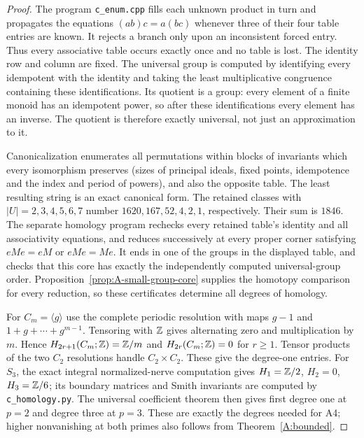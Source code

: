 \begin{proof}
The program \texttt{c\_enum.cpp} fills each unknown product in turn and
propagates the equations $(ab)c=a(bc)$ whenever three of their four table
entries are known. It rejects a branch only upon an inconsistent forced
entry. Thus every associative table occurs exactly once and no table is
lost. The identity row and column are fixed. The universal group is computed
by identifying every idempotent with the identity and taking the least
multiplicative congruence containing these identifications. Its quotient is
a group: every element of a finite monoid has an idempotent power, so after
these identifications every element has an inverse. The quotient is therefore
exactly universal, not just an approximation to it.

Canonicalization enumerates all permutations within blocks of invariants
which every isomorphism preserves (sizes of principal ideals, fixed points,
idempotence and the index and period of powers), and also the opposite table.
The least resulting string is an exact canonical form. The retained classes
with $|U|=2,3,4,5,6,7$ number $1620,167,52,4,2,1$, respectively.
Their sum is $1846$. The separate homology program rechecks every retained
table's identity and all associativity equations, and reduces successively
at every proper corner satisfying $eMe=eM$ or $eMe=Me$.
It ends in one of the groups in the displayed table, and checks that this
core has exactly the independently computed universal-group order.
Proposition~\ref{prop:A-small-group-core} supplies the homotopy comparison
for every reduction, so these certificates determine all degrees of homology.

For $C_m=\langle g\rangle$ use the complete periodic resolution with maps
$g-1$ and $1+g+\cdots+g^{m-1}$. Tensoring with $\mathbb Z$ gives alternating
zero and multiplication by $m$. Hence $H_{2r+1}(C_m;\mathbb Z)=\mathbb Z/m$ and
$H_{2r}(C_m;\mathbb Z)=0$ for $r\ge1$. Tensor products of the two $C_2$
resolutions handle $C_2\times C_2$. These give the degree-one entries.
For $S_3$, the exact integral normalized-nerve computation gives
$H_1=\mathbb Z/2$, $H_2=0$, $H_3=\mathbb Z/6$; its boundary matrices and Smith
invariants are computed by \texttt{c\_homology.py}. The universal
coefficient theorem then gives first degree one at $p=2$ and degree three
at $p=3$. These are exactly the degrees needed for A4; higher nonvanishing
at both primes also follows from Theorem~\ref{A:bounded}.
\end{proof}
